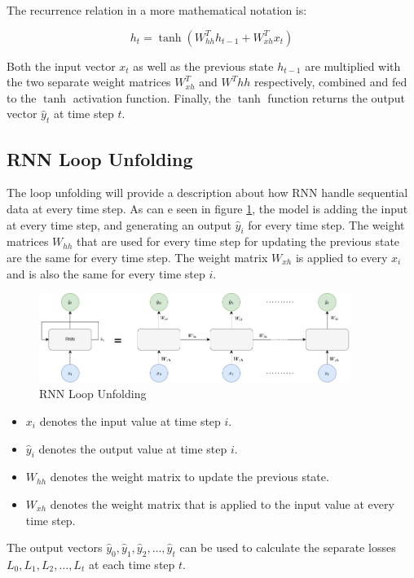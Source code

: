             The recurrence relation in a more mathematical notation is:

            $$h_t = \tanh(W^T_{hh} h_{t-1} + W^T_{xh} x_t)$$
            
            Both the input vector $x_t$ as well as the previous state $h_{t-1}$ are multiplied with the two separate weight matrices $W^T_{xh}$ and $W^T{hh}$ respectively, combined and fed to the $\tanh$ activation function. Finally, the $\tanh$ function returns the output vector $\hat{y}_t$ at time step $t$.

        \subsection{RNN Loop Unfolding}
        \label{sec:rnn-loop-unfolding-background}

            The loop unfolding will provide a description about how RNN handle sequential data at every time step.
            As can  e seen in figure \ref{fig:rnn-loop-unfolding}, the model is adding the input at every time step, and generating an output $\hat{y}_i$ for every time step.
            The weight matrices $W_{hh}$ that are used for every time step for updating the previous state are the same for every time step.
            The weight matrix $W_{xh}$ is applied to every $x_i$ and is also the same for every time step $i$.

            \begin{figure}[h!]
                \centering
                \includegraphics[width=0.90\textwidth]{figures/rnn_loop_unfolding.drawio.png}
                \caption{RNN Loop Unfolding}
                \label{fig:rnn-loop-unfolding}
            \end{figure}
            \begin{itemize}[label=\textemdash]
                \item $x_i$ denotes the input value at time step $i$.
                \item $\hat{y}_i$ denotes the output value at time step $i$.
                \item $W_{hh}$ denotes the weight matrix to update the previous state.
                \item $W_{xh}$ denotes the weight matrix that is applied to the input value at every time step.
            \end{itemize}
            The output vectors $\hat{y}_0, \hat{y}_1, \hat{y}_2, \dots, \hat{y}_t$ can be used to calculate the separate losses $L_0, L_1, L_2, \dots, L_t$ at each time step $t$.

